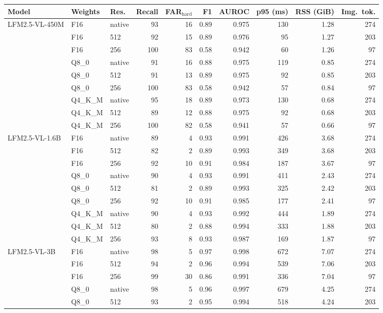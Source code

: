 \begin{tabular}{lllrrrrrrr}
\toprule
Model & Weights & Res. & Recall & FAR$_\text{hard}$ & F1 & AUROC & p95 (ms) & RSS (GiB) & Img.\ tok. \\
\midrule
LFM2.5-VL-450M & F16 & native & 93 & 16 & 0.89 & 0.975 & 130 & 1.28 & 274 \\
 & F16 & 512 & 92 & 15 & 0.89 & 0.976 & 95 & 1.27 & 203 \\
 & F16 & 256 & 100 & 83 & 0.58 & 0.942 & 60 & 1.26 & 97 \\
 & Q8\_0 & native & 91 & 16 & 0.88 & 0.975 & 119 & 0.85 & 274 \\
 & Q8\_0 & 512 & 91 & 13 & 0.89 & 0.975 & 92 & 0.85 & 203 \\
 & Q8\_0 & 256 & 100 & 83 & 0.58 & 0.942 & 57 & 0.84 & 97 \\
 & Q4\_K\_M & native & 95 & 18 & 0.89 & 0.973 & 130 & 0.68 & 274 \\
 & Q4\_K\_M & 512 & 89 & 12 & 0.88 & 0.975 & 92 & 0.68 & 203 \\
 & Q4\_K\_M & 256 & 100 & 82 & 0.58 & 0.941 & 57 & 0.66 & 97 \\
\midrule
LFM2.5-VL-1.6B & F16 & native & 89 & 4 & 0.93 & 0.991 & 426 & 3.68 & 274 \\
 & F16 & 512 & 82 & 2 & 0.89 & 0.993 & 349 & 3.68 & 203 \\
 & F16 & 256 & 92 & 10 & 0.91 & 0.984 & 187 & 3.67 & 97 \\
 & Q8\_0 & native & 90 & 4 & 0.93 & 0.991 & 411 & 2.43 & 274 \\
 & Q8\_0 & 512 & 81 & 2 & 0.89 & 0.993 & 325 & 2.42 & 203 \\
 & Q8\_0 & 256 & 92 & 10 & 0.91 & 0.985 & 177 & 2.41 & 97 \\
 & Q4\_K\_M & native & 90 & 4 & 0.93 & 0.992 & 444 & 1.89 & 274 \\
 & Q4\_K\_M & 512 & 80 & 2 & 0.88 & 0.994 & 333 & 1.88 & 203 \\
 & Q4\_K\_M & 256 & 93 & 8 & 0.93 & 0.987 & 169 & 1.87 & 97 \\
\midrule
LFM2.5-VL-3B & F16 & native & 98 & 5 & 0.97 & 0.998 & 672 & 7.07 & 274 \\
 & F16 & 512 & 94 & 2 & 0.96 & 0.994 & 539 & 7.06 & 203 \\
 & F16 & 256 & 99 & 30 & 0.86 & 0.991 & 336 & 7.04 & 97 \\
 & Q8\_0 & native & 98 & 5 & 0.96 & 0.997 & 679 & 4.25 & 274 \\
 & Q8\_0 & 512 & 93 & 2 & 0.95 & 0.994 & 518 & 4.24 & 203 \\

\end{tabular}

